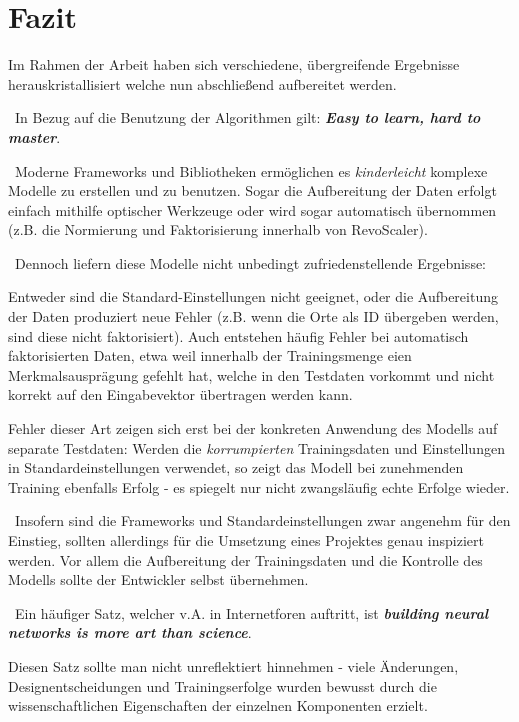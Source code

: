 \chapter{Fazit}
\label{cha:Fazit} \label{cha:Schluss}
Im Rahmen der Arbeit haben sich verschiedene, übergreifende Ergebnisse herauskristallisiert welche nun abschließend aufbereitet werden.

~\newline In Bezug auf die Benutzung der Algorithmen gilt: \textit{\textbf{Easy to learn, hard to master}}. 

~\newline Moderne Frameworks und Bibliotheken ermöglichen es \textit{kinderleicht} komplexe Modelle zu erstellen und zu benutzen. Sogar die Aufbereitung der Daten erfolgt einfach mithilfe optischer Werkzeuge oder wird sogar automatisch übernommen (z.B. die Normierung und Faktorisierung innerhalb von RevoScaler).

~\newline Dennoch liefern diese Modelle nicht unbedingt zufriedenstellende Ergebnisse: 

Entweder sind die Standard-Einstellungen nicht geeignet, oder die Aufbereitung der Daten produziert neue Fehler (z.B. wenn die Orte als ID übergeben werden, sind diese nicht faktorisiert). Auch entstehen häufig Fehler bei automatisch faktorisierten Daten, etwa weil innerhalb der Trainingsmenge eien Merkmalsausprägung gefehlt hat, welche in den Testdaten vorkommt und nicht korrekt auf den Eingabevektor übertragen werden kann. 

Fehler dieser Art zeigen sich erst bei der konkreten Anwendung des Modells auf separate Testdaten: Werden die \textit{korrumpierten} Trainingsdaten und Einstellungen in Standardeinstellungen verwendet, so zeigt das Modell bei zunehmenden Training ebenfalls Erfolg - es spiegelt nur nicht zwangsläufig echte Erfolge wieder.

~\newline Insofern sind die Frameworks und Standardeinstellungen zwar angenehm für den Einstieg, sollten allerdings für die Umsetzung eines Projektes genau inspiziert werden. Vor allem die Aufbereitung der Trainingsdaten und die Kontrolle des Modells sollte der Entwickler selbst übernehmen.  

~\newline Ein häufiger Satz, welcher v.A. in Internetforen auftritt, ist \textit{\textbf{building neural networks is more art than science}}.

Diesen Satz sollte man nicht unreflektiert hinnehmen - viele Änderungen, Designentscheidungen und Trainingserfolge wurden bewusst durch die wissenschaftlichen Eigenschaften der einzelnen Komponenten erzielt. 

